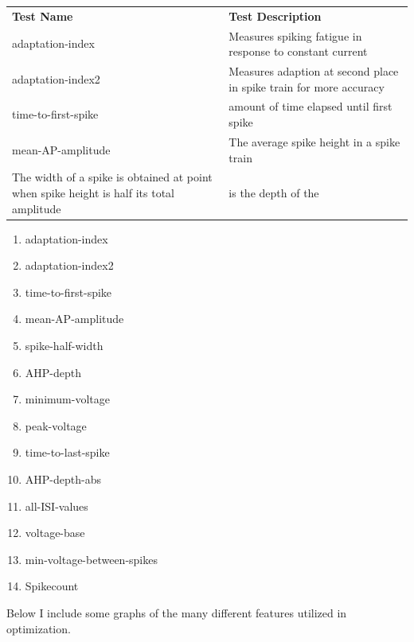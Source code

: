 \begin{table}
\centering
\begin{tabular}{ll}
            \textbf{Test Name} & \textbf{Test Description}\\
adaptation-index      & Measures spiking fatigue in response to constant current          \\
 adaptation-index2   & Measures adaption at second place in spike train for more accuracy    \\
time-to-first-spike       & amount of time elapsed until first spike \\ mean-AP-amplitude & The average spike height in a spike train \\    The width of a spike is obtained at point when spike height is half its total amplitude & is the depth of the    
\end{tabular}
\end{table}
\begin{enumerate}
\item adaptation-index
\item adaptation-index2
\item time-to-first-spike
\item mean-AP-amplitude
\item spike-half-width
\item AHP-depth
\item minimum-voltage
\item peak-voltage
\item time-to-last-spike
\item AHP-depth-abs
\item all-ISI-values
\item voltage-base
\item min-voltage-between-spikes
\item Spikecount
\end{enumerate}


Below I include some graphs of the many different features utilized in optimization.

